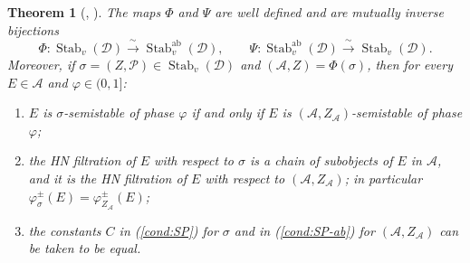\documentclass[12pt]{amsart}
\newcommand{\condref}[1]{\textup{(\ref{#1})}}
\newtheorem{theorem}{Theorem}
\numberwithin{theorem}{section}
\theoremstyle{definition}
\newcommand{\calA}{\mathcal{A}}
\newcommand{\calP}{\mathcal{P}}
\newcommand{\calD}{\mathcal{D}}
\begin{document}
	\begin{theorem}[{\cite[Prop.~5.3]{Bri07}}, {\cite[Lemma~5.11]{MS17}}]
		\label{thm:bijection}
		The maps $\Phi$ and $\Psi$ are well defined and are mutually inverse bijections
		\[
		\Phi \colon \operatorname{Stab}_v(\calD) \xrightarrow{\ \sim\ } \operatorname{Stab}^{\mathrm{ab}}_v(\calD) , \qquad
		\Psi \colon \operatorname{Stab}^{\mathrm{ab}}_v(\calD) \xrightarrow{\ \sim\ } \operatorname{Stab}_v(\calD) .
		\]
		Moreover, if $\sigma = (Z, \calP) \in \operatorname{Stab}_v(\calD)$ and $(\calA, Z) = \Phi(\sigma)$, then for every $E \in \calA$ and $\varphi \in (0, 1]$:
		\begin{enumerate}
			\item $E$ is $\sigma$-semistable of phase $\varphi$ if and only if $E$ is $(\calA, Z_{\calA})$-semistable of phase $\varphi$;
			\item the HN filtration of $E$ with respect to $\sigma$ is a chain of subobjects of $E$ in $\calA$, and it is the HN filtration of $E$ with respect to $(\calA, Z_{\calA})$; in particular $\varphi^{\pm}_{\sigma}(E) = \varphi^{\pm}_{Z_{\calA}}(E)$;
			\item the constants $C$ in \condref{cond:SP} for $\sigma$ and in \condref{cond:SP-ab} for $(\calA, Z_{\calA})$ can be taken to be equal.
		\end{enumerate}
	\end{theorem}
\end{document}
